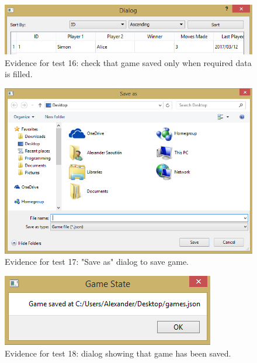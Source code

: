 \begin{figure}[H]
	\centering
	\includegraphics[width=1.0\textwidth]{images/screenshots/test-16}
	\caption{Evidence for test 16: check that game saved only when required data is filled.}
	\label{test-16}
\end{figure}
\begin{figure}[H]
	\centering
	\includegraphics[width=1.0\textwidth]{images/screenshots/test-17}
	\caption{Evidence for test 17: "Save as" dialog to save game.}
	\label{test-17}
\end{figure}
\begin{figure}[H]
	\centering
	\includegraphics{images/screenshots/test-18}
	\caption{Evidence for test 18: dialog showing that game has been saved.}
	\label{test-18}
\end{figure}
